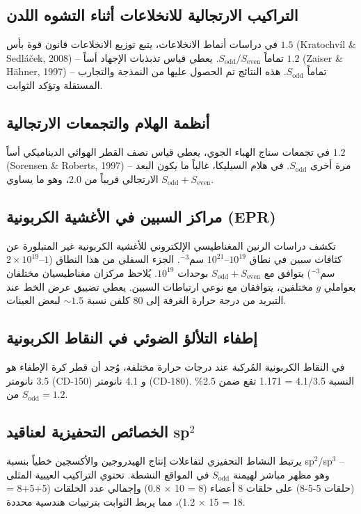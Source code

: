 \documentclass[11pt,a4paper]{article}
\begin{document}
	\subsection{التراكيب الارتجالية للانخلاعات أثناء التشوه اللدن}
	في دراسات أنماط الانخلاعات، يتبع توزيع الانخلاعات قانون قوة بأس \(1.5\) (Kratochv\'il \& Sedl\'a\v{c}ek, 2008) -- تماماً \(S_{\text{odd}}/S_{\text{even}}\). يعطي قياس تذبذبات الإجهاد أساً \(1.2\) (Zaiser \& H\"ahner, 1997) -- تماماً \(S_{\text{odd}}\). هذه النتائج تم الحصول عليها من النمذجة والتجارب المستقلة وتؤكد الثوابت.
	
	\subsection{أنظمة الهلام والتجمعات الارتجالية}
	في تجمعات سناج الهباء الجوي، يعطي قياس نصف القطر الهوائي الديناميكي أساً \(1.2\) (Sorensen \& Roberts, 1997) -- مرة أخرى \(S_{\text{odd}}\). في هلام السيليكا، غالباً ما يكون البعد الارتجالي قريباً من 2.0، وهو ما يساوي \(S_{\text{odd}}+S_{\text{even}}\).
	
	\subsection{مراكز السبين في الأغشية الكربونية (EPR)}
	تكشف دراسات الرنين المغناطيسي الإلكتروني للأغشية الكربونية غير المتبلورة عن كثافات سبين في نطاق \(10^{19}\)--\(10^{21}\) سم\({}^{-3}\). الجزء السفلي من هذا النطاق (\(1\)--\(2\times10^{19}\) سم\({}^{-3}\)) يتوافق مع \(S_{\text{odd}}+S_{\text{even}}\) بوحدات \(10^{19}\). يُلاحظ مركزان مغناطيسيان مختلفان بعواملي \(g\) مختلفين، يتوافقان مع نوعي ارتباطات السبين. يعطي تضييق عرض الخط عند التبريد من درجة حرارة الغرفة إلى 80 كلفن نسبة \(\sim 1.5\) لبعض العينات.
	
	\subsection{إطفاء التلألؤ الضوئي في النقاط الكربونية}
	في النقاط الكربونية المُركبة عند درجات حرارة مختلفة، وُجد أن قطر كرة الإطفاء هو 3.5 نانومتر (CD-150) و 4.1 نانومتر (CD-180). النسبة 4.1/3.5 = 1.171 تقع ضمن 2.5\% من \(S_{\text{odd}}=1.2\).
	
	\subsection{الخصائص التحفيزية لعناقيد sp\({}^2\)}
	يرتبط النشاط التحفيزي لتفاعلات إنتاج الهيدروجين والأكسجين خطياً بنسبة sp\({}^2\)/sp\({}^3\) -- وهو مظهر مباشر لهيمنة \(S_{\text{odd}}\) في المواقع النشطة. تحتوي التراكيب العيبية المثلى (حلقات 5-5-8) على حلقات 8 أعضاء (8 = 10 \(\times\) 0.8) وإجمالي عدد الحلقات (5+5+8 = 18 = 15 \(\times\) 1.2)، مما يربط الثوابت بترتيبات هندسية محددة.
	
\end{document}
